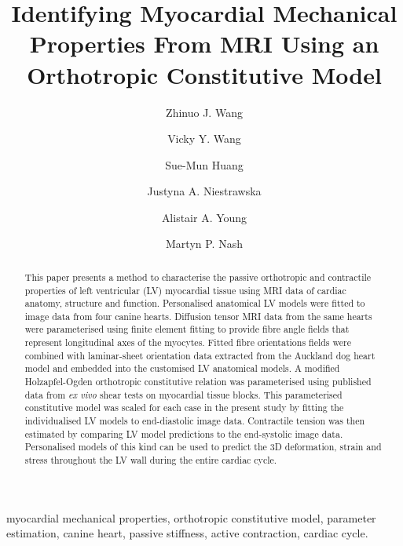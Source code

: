 \documentclass{llncs}
\begin{document}
\title{Identifying Myocardial Mechanical Properties From MRI Using an Orthotropic Constitutive Model}
\author{Zhinuo J. Wang\and Vicky Y. Wang\and Sue-Mun Huang\and Justyna A. Niestrawska\and Alistair A. Young \and Martyn P. Nash}
\maketitle

\begin{abstract}
This paper presents a method to characterise the passive orthotropic and contractile properties of left ventricular (LV) myocardial tissue using MRI data of cardiac anatomy, structure and function. Personalised anatomical LV models were fitted to image data from four canine hearts.  Diffusion tensor MRI data from the same hearts were parameterised using finite element fitting to provide fibre angle fields that represent longitudinal axes of the myocytes. Fitted fibre orientations fields were combined with laminar-sheet orientation data extracted from the Auckland dog heart model and embedded into the customised LV anatomical models. A modified Holzapfel-Ogden orthotropic constitutive relation was parameterised using published data from {\itshape ex vivo} shear tests on myocardial tissue blocks. This parameterised constitutive model was scaled for each case in the present study by fitting the individualised LV models to end-diastolic image data. Contractile tension was then estimated by comparing LV model predictions to the end-systolic image data. Personalised models of this kind can be used to predict the 3D deformation, strain and stress throughout the LV wall during the entire cardiac cycle.
\end{abstract}

\begin{keywords} myocardial mechanical properties, orthotropic constitutive model, parameter estimation, canine heart, passive stiffness, active contraction, cardiac cycle. 
	
\end{keywords}
\end{document}

